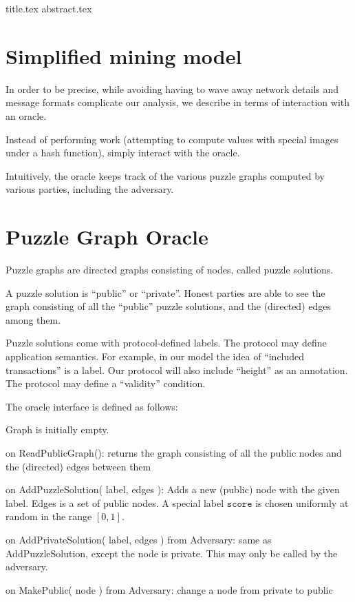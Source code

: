 \documentclass[11pt]{llncs}
\begin{document}
{title.tex}
\thispagestyle{plain}
{abstract.tex}


\section{Simplified mining model}

In order to be precise, while avoiding having to wave away network details and
message formats complicate our analysis, we describe in terms of interaction
with an oracle.

Instead of performing work (attempting to compute values with special images
under a hash function), simply interact with the oracle.

Intuitively, the oracle keeps track of the various puzzle graphs computed by
various parties, including the adversary.

\section{Puzzle Graph Oracle}

Puzzle graphs are directed graphs consisting of nodes, called puzzle solutions.

A puzzle solution is ``public'' or ``private''. Honest parties are able to see
the graph consisting of all the ``public'' puzzle solutions, and the (directed)
edges among them.

Puzzle solutions come with protocol-defined labels. The protocol may define
application semantics. For example, in our model the idea of ``included
transactions'' is a label. Our protocol will also include ``height'' as an
annotation. The protocol may define a ``validity'' condition.

The oracle interface is defined as follows:

    Graph is initially empty.

    on ReadPublicGraph():
        returns the graph consisting of all the public nodes and the (directed) edges between them

    on AddPuzzleSolution( label, edges ):
        Adds a new (public) node with the given label. Edges is a set of public nodes.
        A special label $\texttt{score}$ is chosen uniformly at random in the
        range $[0, 1]$.

    on AddPrivateSolution( label, edges ) from Adversary:
        same as AddPuzzleSolution, except the node is private. This may only be called by the adversary.


    on MakePublic( node ) from Adversary: change a node from private to public
\end{document}
